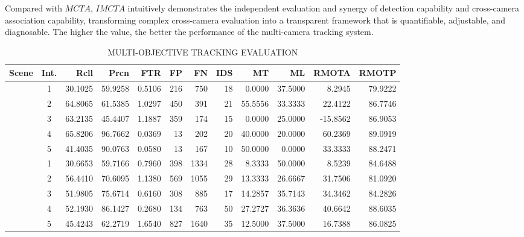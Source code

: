 \documentclass[journal,twoside,web]{ieeecolor}
\begin{document}
Compared with \(MCTA\), \(IMCTA\) intuitively demonstrates the independent evaluation and synergy of detection capability and cross-camera association capability, transforming complex cross-camera evaluation into a transparent framework that is quantifiable, adjustable, and diagnosable. 
The higher the value, the better the performance of the multi-camera tracking system.

\begin{table}[t]
	\centering
	\caption{MULTI-OBJECTIVE TRACKING EVALUATION}
	\label{tab:2}
	\small
	\begin{tabular}{@{}l@{\hspace{1em}}c@{\hspace{0.5em}}*{10}{r}@{}}
		\toprule
		\textbf{Scene} & \textbf{Int.} & \textbf{Rcll} & \textbf{Prcn} & \textbf{FTR} & \textbf{FP} & \textbf{FN} & \textbf{IDS} & \textbf{MT} & \textbf{ML} & \textbf{RMOTA} & \textbf{RMOTP} \\
		\midrule
		& 1 & 30.1025 & 59.9258 & 0.5106 & 216 & 750 & 18 & 0.0000 & 37.5000 & 8.2945 & 79.9222\\
		& 2 & 64.8065 & 61.5385 & 1.0297 & 450 & 391 & 21 & 55.5556 & 33.3333 & 22.4122 & 86.7746\\
		& 3 & 63.2135 & 45.4407 & 1.1887 & 359 & 174 & 15 & 0.0000 & 25.0000 & -15.8562 & 86.9053\\
		& 4 & 65.8206 & 96.7662 & 0.0369 & 13 & 202 & 20 & 40.0000 & 20.0000 & 60.2369 & 89.0919\\
		& 5 & 41.4035 & 90.0763 & 0.0580 & 13 & 167 & 10 & 50.0000 & 0.0000 & 33.3333 & 88.2471\\
		\midrule
		& 1 & 30.6653 & 59.7166 & 0.7960 & 398 & 1334 & 28 & 8.3333 & 50.0000 & 8.5239 & 84.6488\\
		& 2 & 56.4410 & 70.6095 & 1.1380 & 569 & 1055 & 29 & 13.3333 & 26.6667 & 31.7506 & 81.0920\\
		& 3 & 51.9805 & 75.6714 & 0.6160 & 308 & 885 & 17 & 14.2857 & 35.7143 & 34.3462 & 84.2826\\
		& 4 & 52.1930 & 86.1427 & 0.2680 & 134 & 763 & 50 & 27.2727 & 36.3636 & 40.6642 & 88.6035\\
		& 5 & 45.4243 & 62.2719 & 1.6540 & 827 & 1640 & 35 & 12.5000 & 37.5000 & 16.7388 & 86.0825\\
		\bottomrule
	\end{tabular}
\end{table}
\end{document}

